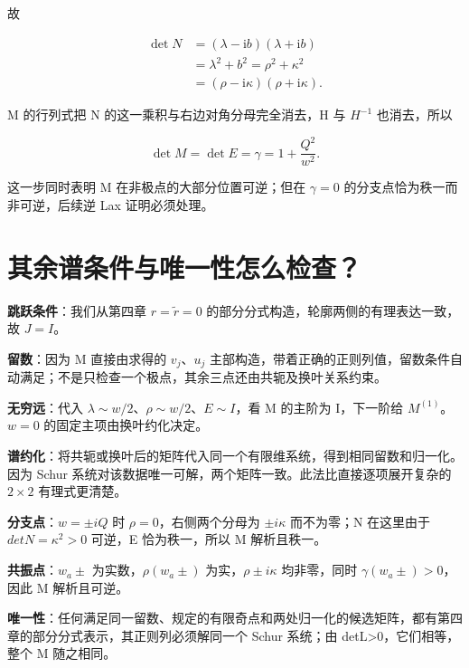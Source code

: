 故\par

\[
\begin{aligned}
\det N
&=(\lambda-\mathrm{i}b)(\lambda+\mathrm{i}b)\\
&=\lambda^2+b^2
=\rho^2+\kappa^2\\
&=(\rho-\mathrm{i}\kappa)(\rho+\mathrm{i}\kappa).
\end{aligned}
\]

M 的行列式把 N 的这一乘积与右边对角分母完全消去，H 与 $H^{-1}$ 也消去，所以\par

\[
\det M=\det E=\gamma=1+\dfrac{Q^2}{w^2}.
\]

这一步同时表明 M 在非极点的大部分位置可逆；但在 $\gamma{}=0$ 的分支点恰为秩一而非可逆，后续逆 Lax 证明必须处理。\par

\section{其余谱条件与唯一性怎么检查？}

\textbf{跳跃条件}：我们从第四章 $r=\widetilde r=0$ 的部分分式构造，轮廓两侧的有理表达一致，故 $J=I$。\par

\textbf{留数}：因为 M 直接由求得的 $v_j$、$u_j$ 主部构造，带着正确的正则列值，留数条件自动满足；不是只检查一个极点，其余三点还由共轭及换叶关系约束。\par

\textbf{无穷远}：代入 $\lambda{}\sim{}w/2$、$\rho{}\sim{}w/2$、$E\sim{}I$，看 M 的主阶为 I，下一阶给 $M^{(1)}$。$w=0$ 的固定主项由换叶约化决定。\par

\textbf{谱约化}：将共轭或换叶后的矩阵代入同一个有限维系统，得到相同留数和归一化。因为 Schur 系统对该数据唯一可解，两个矩阵一致。此法比直接逐项展开复杂的 $2\times{}2$ 有理式更清楚。\par

\textbf{分支点}：$w=\pm{}iQ$ 时 $\rho{}=0$，右侧两个分母为 $\pm{}i\kappa{}$ 而不为零；N 在这里由于 $detN=\kappa{}^{2}>0$ 可逆，E 恰为秩一，所以 M 解析且秩一。\par

\textbf{共振点}：$w_{a}\pm{}$ 为实数，$\rho{}(w_{a}\pm{})$ 为实，$\rho{}\pm{}i\kappa{}$ 均非零，同时 $\gamma{}(w_{a}\pm{})>0$，因此 M 解析且可逆。\par

\textbf{唯一性}：任何满足同一留数、规定的有限奇点和两处归一化的候选矩阵，都有第四章的部分分式表示，其正则列必须解同一个 Schur 系统；由 detL>0，它们相等，整个 M 随之相同。\par

